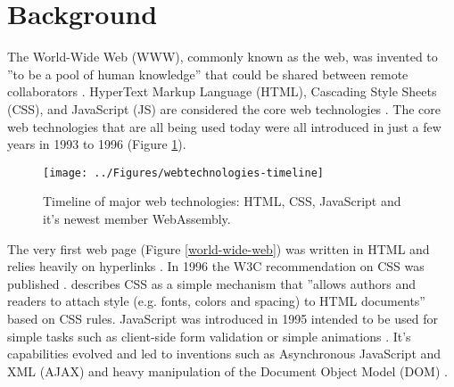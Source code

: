 \section{Background}
\label{background}

The World-Wide Web (WWW), commonly known as the web, was invented to ''to be a pool of human knowledge'' \parencite*[76]{BernersLeeCailliauLuotonenNielsenSecret1994} that could be shared between remote collaborators \parencite{BernersLeeCailliauLuotonenNielsenSecret1994}. HyperText Markup Language (HTML), Cascading Style Sheets (CSS), and JavaScript (JS) are considered the core web technologies \parencite{MajchrzakBiornHansenGronli2018}. The core web technologies that are all being used today were all introduced in just a few years in 1993 to 1996 (Figure \ref{webtechnologies-timeline}).

\begin{figure}[!h]
\centering
\texttt{[image: ../Figures/webtechnologies-timeline]}
\caption{Timeline of major web technologies: HTML, CSS, JavaScript and it's newest member WebAssembly.}
\label{webtechnologies-timeline}
\end{figure}

The very first web page (Figure \ref{world-wide-web}) was written in HTML and relies heavily on hyperlinks \parencite{BernersLeeCailliauGroffPollermann1992}. In 1996 the W3C recommendation on CSS was published \parencite{LieBos1996}. \citeauthor{LieBos1996} describes CSS as a simple mechanism that ''allows authors and readers to attach style (e.g. fonts, colors and spacing) to HTML documents'' \parencite*[1]{LieBos1996} based on CSS rules. JavaScript was introduced in 1995 intended to be used for simple tasks such as client-side form validation or simple animations \parencite{Moller2018}. It's capabilities evolved and led to inventions such as Asynchronous JavaScript and XML (AJAX) \parencite{NielsonWilliamsonArlitt2008} and heavy manipulation of the Document Object Model (DOM) \parencite{WoodLeHorsApparaoByrneChampionIsaacsJacobsNicolRobieSutor1998}.



